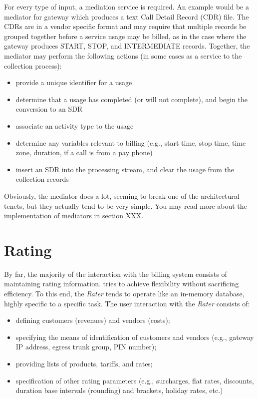 		For every type of input, a mediation service is required. An example
		would be a mediator for \VOIP gateway which produces a text Call Detail
		Record (CDR) file. The CDRs are in a vendor specific format and may
		require that multiple records be grouped together before a service
		usage may be billed, as in the case where the gateway produces START, STOP,
		and INTERMEDIATE records. Together, the mediator may perform the following
		actions (in some cases as a service to the collection process):

		\begin{itemize}
		  \item provide a unique identifier for a usage
		  \item determine that a usage has completed (or will not complete), and
		        begin the conversion to an SDR
		  \item associate an activity type to the usage
		  \item determine any variables relevant to billing (e.g., start time, stop
		        time, time zone, duration, if a call is from a pay phone)
		  
		  \item insert an SDR into the processing stream, and clear the usage
			from the collection records
		\end{itemize}

		Obviously, the mediator does a lot, seeming to break one of the
		architectural tenets, but they actually tend to be very simple.
		You may read more about the implementation of mediators in section XXX.

	\section{Rating}
		By far, the majority of the interaction with the billing system consists
		of maintaining rating information. \XCDR{} tries to achieve flexibility
		without sacrificing efficiency. To this end, the \emph{Rater} tends
		to operate like an in-memory database, highly specific to a specific
		task. The user interaction with the \emph{Rater} consists of:
		\begin{itemize}
		  \item defining customers (revenues) and vendors (costs);
		  \item specifying the means of identification of customers and vendors (e.g., gateway IP address, egress trunk group, PIN number);
		  \item providing lists of products, tariffs, and rates;
		  \item specification of other rating parameters (e.g., surcharges, flat rates, discounts, duration base intervals (rounding) and brackets, holiday rates, etc.)
		\end{itemize}

